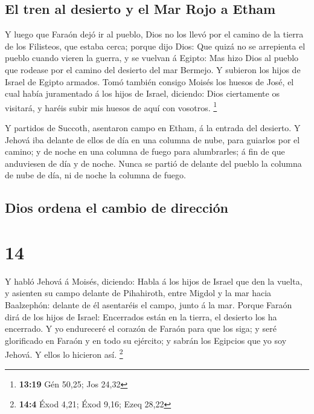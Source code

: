 \hypertarget{el-tren-al-desierto-y-el-mar-rojo-a-etham}{%
\subsection{El tren al desierto y el Mar Rojo a
Etham}\label{el-tren-al-desierto-y-el-mar-rojo-a-etham}}

 Y luego que Faraón dejó ir al pueblo, Dios no los llevó
por el camino de la tierra de los Filisteos, que estaba cerca; porque
dijo Dios: Que quizá no se arrepienta el pueblo cuando vieren la guerra,
y se vuelvan á Egipto:  Mas hizo Dios al pueblo que rodease
por el camino del desierto del mar Bermejo. Y subieron los hijos de
Israel de Egipto armados.  Tomó también consigo Moisés los
huesos de José, el cual había juramentado á los hijos de Israel,
diciendo: Dios ciertamente os visitará, y haréis subir mis huesos de
aquí con vosotros. \footnote{\textbf{13:19} Gén 50,25; Jos 24,32}

 Y partidos de Succoth, asentaron campo en Etham, á la
entrada del desierto.  Y Jehová iba delante de ellos de día
en una columna de nube, para guiarlos por el camino; y de noche en una
columna de fuego para alumbrarles; á fin de que anduviesen de día y de
noche.  Nunca se partió de delante del pueblo la columna de
nube de día, ni de noche la columna de fuego.

\hypertarget{dios-ordena-el-cambio-de-direcciuxf3n}{%
\subsection{Dios ordena el cambio de
dirección}\label{dios-ordena-el-cambio-de-direcciuxf3n}}

\hypertarget{section-13}{%
\section{14}\label{section-13}}

 Y habló Jehová á Moisés, diciendo:  Habla á los
hijos de Israel que den la vuelta, y asienten su campo delante de
Pihahiroth, entre Migdol y la mar hacia Baalzephón: delante de él
asentaréis el campo, junto á la mar.  Porque Faraón dirá de
los hijos de Israel: Encerrados están en la tierra, el desierto los ha
encerrado.  Y yo endureceré el corazón de Faraón para que
los siga; y seré glorificado en Faraón y en todo su ejército; y sabrán
los Egipcios que yo soy Jehová. Y ellos lo hicieron así. \footnote{\textbf{14:4}
  Éxod 4,21; Éxod 9,16; Ezeq 28,22}

